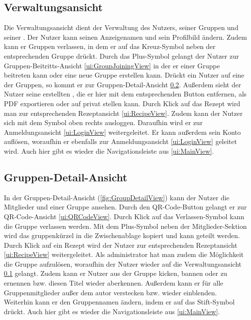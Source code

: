 \documentclass[parskip=full]{scrartcl}
\begin{document}
\subsection{Verwaltungsansicht}
\label{ui:SettingsView}
Die Verwaltungsansicht dient der Verwaltung des Nutzers, seiner Gruppen und seiner . Der Nutzer kann seinen Anzeigenamen und sein Profilbild ändern. Zudem kann er Gruppen verlassen, in dem er auf das Kreuz-Symbol neben der entsprechenden Gruppe drückt. Durch das Plus-Symbol gelangt der Nutzer zur Gruppen-Beitritts-Ansicht \ref{ui:GroupJoiningView} in der er einer Gruppe beitreten kann oder eine neue Gruppe erstellen kann. Drückt ein Nutzer auf eine der Gruppen, so kommt er zur Gruppen-Detail-Ansicht \ref{ui:GroupDetailView}. Außerdem sieht der Nutzer seine erstellten , die er hier mit dem entsprechenden Button entfernen, als PDF exportieren oder auf privat stellen kann. Durch Klick auf das Rezept wird man zur entsprechenden Rezeptansicht \ref{ui:RecipeView}.
Zudem kann der Nutzer sich mit dem Symbol oben rechts ausloggen. Daraufhin wird er zur Anmeldungsansicht \ref{ui:LoginView} weitergeleitet. Er kann außerdem sein Konto auflösen, woraufhin er ebenfalls zur Anmeldungsansicht \ref{ui:LoginView} geleitet wird. Auch hier gibt es wieder die Navigationsleiste aus \ref{ui:MainView}.


\subsection{Gruppen-Detail-Ansicht}
\label{ui:GroupDetailView}
In der Gruppen-Detail-Ansicht (\autoref{fig:GroupDetailView}) kann der Nutzer die Mitglieder und  einer Gruppe ansehen. Durch den QR-Code-Button gelangt er zur QR-Code-Ansicht \ref{ui:QRCodeView}. Durch Klick auf das Verlassen-Symbol kann die Gruppe verlassen werden. Mit dem Plus-Symbol neben der Mitglieder-Sektion wird das \gls{gruppenkürzel} in die Zwischenablage kopiert und kann geteilt werden. Durch Klick auf ein Rezept wird der Nutzer zur entsprechenden Rezeptansicht \ref{ui:RecipeView} weitergeleitet. Als \Gls{administrator} hat man zudem die Möglichkeit die Gruppe aufzulösen, woraufhin der Nutzer wieder auf die Verwaltungsansicht \ref{ui:SettingsView} gelangt. Zudem kann er Nutzer aus der Gruppe \gls{kicken}, \gls{bannen} oder zu  ernennen bzw. diesen Titel wieder aberkennen. Außerdem kann er  für alle Gruppenmitglieder außer dem \gls{autor} verstecken bzw. wieder \gls{einblenden}. Weiterhin kann er den Gruppennamen ändern, indem er auf das Stift-Symbol drückt. Auch hier gibt es wieder die Navigationsleiste aus \ref{ui:MainView}.
\end{document}
